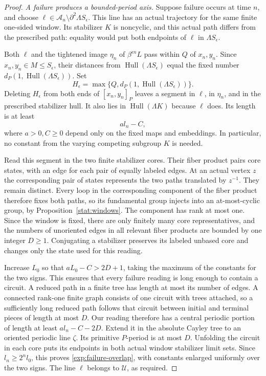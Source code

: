 \begin{proof}
\smallskip\noindent
\emph{A failure produces a bounded-period axis.}
Suppose failure occurs at time $n$, and choose
$\ell\in\mathcal A_n\setminus\partial^2\Lambda S_\epsilon$.
This line has an actual trajectory for the same finite one-sided
window. Its stabilizer $K$ is noncyclic, and this actual path differs
from the prescribed path: equality would put both endpoints of
$\ell$ in $\Lambda S_\epsilon$.

Both $\ell$ and the tightened image $\eta_n$ of
$\beta^{\epsilon n}L$ pass within $Q$ of $x_n,y_n$. Since
$x_n,y_n\in M\le S_\epsilon$, their distances from
$\operatorname{Hull}(\Lambda S_\epsilon)$ equal the fixed number
$d_P(1,\operatorname{Hull}(\Lambda S_\epsilon))$. Set
\[
 H_\epsilon=\max\{Q,
             d_P(1,\operatorname{Hull}(\Lambda S_\epsilon))\}.
\]
Deleting $H_\epsilon$ from both ends of $[x_n,y_n]_P$ leaves a
segment in $\ell$, in $\eta_n$, and in the prescribed stabilizer
hull. It also lies in $\operatorname{Hull}(\Lambda K)$ because
$\ell$ does. Its length is at least
\begin{equation}
 a l_n-C,
 \label{exp:central-overlap}
\end{equation}
where $a>0,C\ge0$ depend only on the fixed maps and embeddings.
In particular, no constant from the varying competing subgroup $K$
is needed.

Read this segment in the two finite stabilizer cores. Their fiber
product pairs core states, with an edge for each pair of equally
labeled edges. At an actual vertex $z$ the corresponding pair of states represents the two
paths translated by $z^{-1}$. They remain distinct. Every loop in
the corresponding component of the fiber product therefore fixes
both paths, so its fundamental group injects into an at-most-cyclic
group, by Proposition~\ref{stat:windows}. The component has rank at most
one. Since the window is fixed, there are only finitely many core
representatives, and the numbers of unoriented edges in all relevant fiber products
are bounded by one integer $D\ge1$. Conjugating a stabilizer preserves its labeled
unbased core and changes only the state used for this reading.

Increase $L_0$ so that $aL_0-C>2D+1$, taking the maximum of
the constants for the two signs. This ensures that every failure
reading is long enough to contain a circuit. A reduced path in a
finite tree has length at most its number of edges. A connected
rank-one finite graph consists of one circuit with trees attached,
so a sufficiently long reduced path follows that circuit between
initial and terminal pieces of length at most $D$.
Our reading therefore has a central periodic portion of length at
least $a l_n-C-2D$. Extend it in the absolute Cayley tree to an
oriented periodic line $\zeta$. Its primitive $P$-period is at most
$D$. Unfolding the circuit in each core puts its endpoints in both
actual window stabilizer limit sets. Since $l_n\ge2^n l_0$, this
proves \eqref{exp:failure-overlap}, with constants enlarged uniformly
over the two signs. The line $\ell$ belongs to $\mathcal U$, as
required.
\end{proof}

